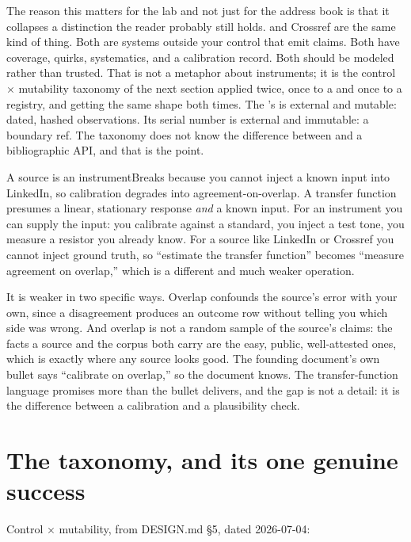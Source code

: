The reason this matters for the lab and not just for the address book is that it collapses a distinction the reader probably still holds. \labMagnet{} and Crossref are the same kind of thing. Both are systems outside your control that emit claims. Both have coverage, quirks, systematics, and a calibration record. Both should be modeled rather than trusted. That is not a metaphor about instruments; it is the control $\times$ mutability taxonomy of the next section applied twice, once to a \labMagnetShort{} and once to a registry, and getting the same shape both times. The \labMagnetShort's \labMagnetReadout{} is external and mutable: dated, hashed observations. Its serial number is external and immutable: a boundary ref. The taxonomy does not know the difference between \labColdSystem{} and a bibliographic API, and that is the point.

\begin{Analogy}{A source is an instrument}{Breaks because you cannot inject a known input into LinkedIn, so calibration degrades into agreement-on-overlap.}
A transfer function presumes a linear, stationary response \emph{and} a known input. For an instrument you can supply the input: you calibrate against a standard, you inject a test tone, you measure a resistor you already know. For a source like LinkedIn or Crossref you cannot inject ground truth, so ``estimate the transfer function'' becomes ``measure agreement on overlap,'' which is a different and much weaker operation.

It is weaker in two specific ways. Overlap confounds the source's error with your own, since a disagreement produces an outcome row without telling you which side was wrong. And overlap is not a random sample of the source's claims: the facts a source and the corpus both carry are the easy, public, well-attested ones, which is exactly where any source looks good. The founding document's own bullet says ``calibrate on overlap,'' so the document knows. The transfer-function language promises more than the bullet delivers, and the gap is not a detail: it is the difference between a calibration and a plausibility check.
\end{Analogy}

\section{The taxonomy, and its one genuine success}

Control $\times$ mutability, from \textsf{DESIGN.md} \S5, dated 2026-07-04:

